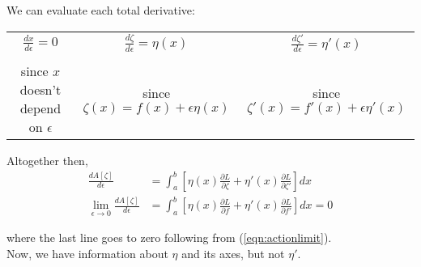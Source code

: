 \documentclass{article}
\newcommand{\DD}[2]{\frac{d #1}{d #2}}
\newcommand{\PD}[2]{\frac{\partial #1}{\partial #2}}
\begin{document}
We can evaluate each total derivative:

\begin{center}
    \begin{tabular}{ c|c|c }
        $\displaystyle \DD{x}{\epsilon}  = 0$
         & $\displaystyle \DD{\zeta}{\epsilon}  = \eta(x)$
         & $\displaystyle \DD{\zeta'}{\epsilon} = \eta'(x)$   \\
         &                                                  & \\
        since $x$ doesn't depend on $\epsilon$
         & since $\zeta(x) = f(x) + \epsilon \eta(x)$
         & since $\zeta'(x) = f'(x) + \epsilon \eta'(x)$      \\
    \end{tabular}
\end{center}

Altogether then,
\begin{align}
    \DD{A[\zeta]}{\epsilon}
     & = \int_a^b
    \left[
        \eta(x) \PD{L}{\zeta}
        + \eta'(x) \PD{L}{\zeta'}
    \right] dx    \\
    \lim_{\epsilon \to 0}
    \DD{A[\zeta]}{\epsilon}
     & = \int_a^b
    \left[
        \eta(x) \PD{L}{f}
        + \eta'(x) \PD{L}{f'}
        \right] dx
    = 0
\end{align}

\hspace{\parindent} where the last line goes to zero following from (\ref{eqn:actionlimit}).
\\

Now, we have information about $\eta$ and its axes, but not $\eta'$.
\end{document}
